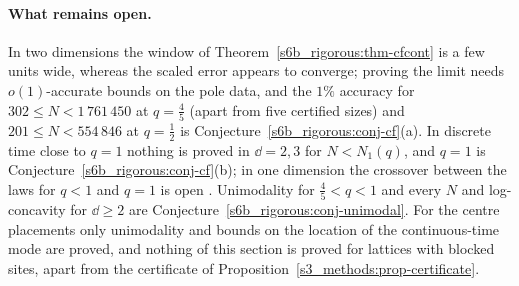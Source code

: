 \paragraph{What remains open.} In two dimensions the window of Theorem~\ref{s6b_rigorous:thm-cfcont} is a few units
wide, whereas the scaled error appears to converge; proving the limit needs $o(1)$-accurate bounds on the pole data,
and the $1\%$ accuracy for $302\le N<1\,761\,450$ at $q=\frac45$ (apart from five certified sizes) and $201\le N<554\,846$
at $q=\frac12$ is Conjecture~\ref{s6b_rigorous:conj-cf}(a). In discrete time close to $q=1$ nothing is proved in
$\dd=2,3$ for $N<N_1(q)$, and $q=1$ is Conjecture~\ref{s6b_rigorous:conj-cf}(b); in one dimension the crossover between
the laws for $q<1$ and $q=1$ is open . Unimodality for $\frac45<q<1$ and every $N$ and log-concavity
for $\dd\ge2$ are Conjecture~\ref{s6b_rigorous:conj-unimodal}. For the centre placements only unimodality and bounds on
the location of the continuous-time mode  are proved, and nothing of this section is proved for
lattices with blocked sites, apart from the certificate of Proposition~\ref{s3_methods:prop-certificate}.
